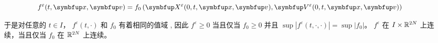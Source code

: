 \begin{lemma}
\begin{enumerate}[(i)]
    \begin{equation}
        \label{eq:characteristic-traceback}
    f^{\varepsilon}(t, \vx, \vv)=f_{0}\left(\vect{X}^{\varepsilon}(0, t, \vx, \vv), \vect{V}^{\varepsilon}(0, t, \vx, \vv)\right)
    \end{equation}

    于是对任意的 $t \in I$， $f^{\varepsilon}(t, \cdot)$ 和 $f_{0}$ 有着相同的值域 , 因此 $f^{\varepsilon} \geqslant 0$ 当且仅当 $f_{0} \geqslant 0$ 并且 $\sup \left|f^{\varepsilon}(t, \cdot,\cdot)\right|=\sup |f_{0}|$。 $f^{\varepsilon}$ 在 $I \times {\mathbb{R}}^{2N}$ 上连续，当且仅当 $f_{0}$ 在 ${\mathbb{R}}^{2N}$ 上连续。%



\end{enumerate}
\end{lemma}

